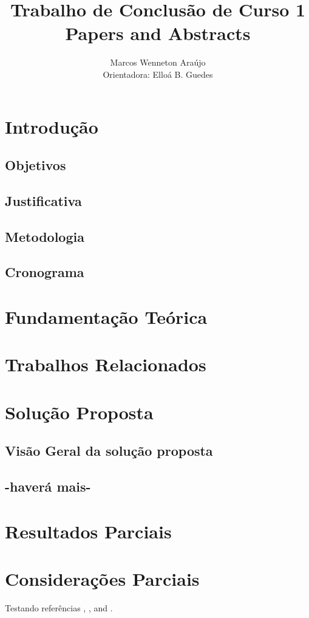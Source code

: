 \documentclass[12pt]{article}
\title{Trabalho de Conclusão de Curso 1\\ Papers and Abstracts}
\author{Marcos Wenneton Araújo\\ 
Orientadora: Elloá B. Guedes}
\begin{document}
 

\maketitle


\section{Introdução} \label{sec:introducao}

\subsection{Objetivos}

\subsection{Justificativa}

\subsection{Metodologia}

\subsection{Cronograma}

\section{Fundamentação Teórica} \label{sec:fund-teor}



\section{Trabalhos Relacionados} \label{sec:trab-rel}



\section{Solução Proposta} \label{sec:sol-prop}

\subsection{Visão Geral da solução proposta}

\subsection{-haverá mais-}

\section{Resultados Parciais} \label{sec:res-parc}


\section{Considerações Parciais} \label{sec:cons-parc}

Testando referências \cite{knuth:84},
\cite{boulic:91}, and \cite{smith:99}.




\end{document}
